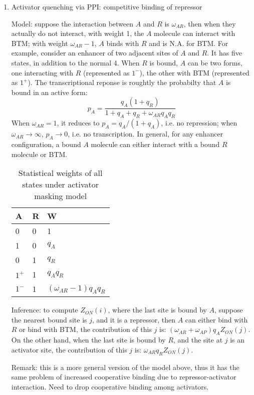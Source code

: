 \documentclass[11pt]{article}
\begin{document}
\begin{enumerate}
\begin{enumerate}
\item{Activator quenching via PPI: competitive binding of repressor}

Model: suppose the interaction between $A$ and $R$ is $\omega_{AR}$, then when they actually do not interact, with weight 1, the $A$ molecule can interact with BTM; with weight $\omega_{AR} - 1$, $A$ binds with $R$ and is N.A. for BTM. For example, consider an enhancer of two adjacent sites of $A$ and $R$. It has five states, in addition to the normal 4. When $R$ is bound, $A$ can be two forms, one interacting with $R$ (represented as $1^-$), the other with BTM (represented as $1^+$). The transcriptional reponse is roughtly the probabilty that $A$ is bound in an active form:
\begin{equation}
p_A = \frac{q_A (1 + q_R)}{1 + q_A + q_R + \omega_{AR} q_A q_R}
\end{equation}  
When $\omega_{AR} = 1$, it reduces to $p_A = q_A / (1 + q_A)$, i.e. no repression; when $\omega_{AR} \rightarrow \infty$, $p_A \rightarrow 0$, i.e. no transcription. In general, for any enhancer configuration, a bound $A$ molecule can either interact with a bound $R$ molecule or BTM. 

\begin{table}[h]
	\centering
		\begin{tabular}{ll|l}
			\hline
			A & R & W \\
			\hline
			0 & 0 & 1\\
			1 & 0 & $q_A$\\
			0 & 1 & $q_R$\\
			$1^+$ & 1 & $q_A q_R$\\
			$1^-$ & 1 & $(\omega_{AR}-1) q_A q_R$\\
			\hline
		\end{tabular}
		\caption{Statistical weights of all states under activator masking model}
		\label{tab:activator-masking}
\end{table}

Inference: to compute $Z_{ON}(i)$, where the last site is bound by $A$, suppose the nearest bound site is $j$, and it is a repressor, then $A$ can either bind with $R$ or bind with BTM, the contribution of this $j$ is: $(\omega_{AR} + \omega_{AP}) q_A Z_{ON}(j)$. On the other hand, when the last site is bound by $R$, and the site at $j$ is an activator site, the contribution of this $j$ is: $\omega_{AR} q_R Z_{ON}(j)$. 

Remark: this is a more general version of the model above, thus it has the same problem of increased cooperative binding due to repressor-activator interaction. Need to drop cooperative binding among activators. 


\end{enumerate}
\end{enumerate}
\end{document}
